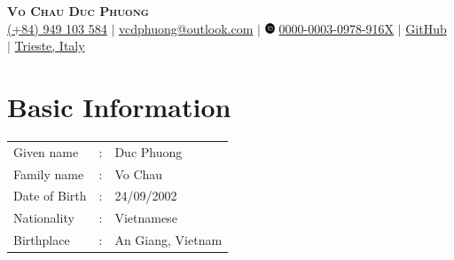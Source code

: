 \documentclass[letterpaper,11pt]{article}
\begin{document}
	
	
	\begin{center}
		\textbf{\Huge \scshape Vo Chau Duc Phuong} \\ \vspace{3pt}
		\small
		\faMobile \hspace{.5pt} \href{tel:84949103584}{(+84) 949 103 584}
		$|$
		\faAt \hspace{.5pt} \href{mailto:vcdphuong@outlook.com}{\color{blue}vcdphuong@outlook.com}
		$|$
		\includegraphics[width=0.3cm]{orcid-brands-solid.pdf} \href{https://orcid.org/my-orcid?orcid=0000-0003-0978-916X}{\color{blue} 0000-0003-0978-916X}
		$|$
		\faGithub \hspace{.5pt} \href{https://github.com/VCDPhuong}{\color{blue}GitHub}
		$|$
\faMapMarker \hspace{.5pt} \href{https://maps.app.goo.gl/fofi8NRNuw2UJQnP6}{\color{blue}Trieste, Italy}
		
	\end{center}
	
	
	
\section{Basic Information}
\vspace{-0.5cm}
\begin{table}[!ht]
\hspace{0.5cm}	\begin{tabular}{l l l}
		Given name      & : \hspace{0.2cm}\null & Duc Phuong              \\
		Family name   & :  & Vo Chau             \\
		Date of Birth \hspace{0.2cm}\null & :  & 24/09/2002          \\
		Nationality   & : & Vietnamese          \\
		Birthplace & :  & An Giang, Vietnam 
		
	\end{tabular}
\end{table}
\vspace{-0.5cm}
\end{document}
